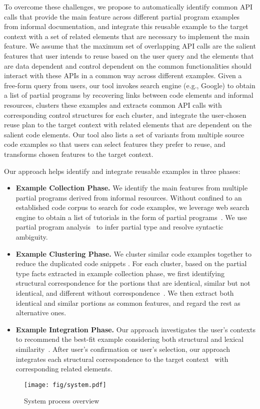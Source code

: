 To overcome these challenges, we propose to automatically identify common API calls that provide the main feature across different partial program examples from informal documentation, and integrate this reusable example to the target context with a set of related elements that are necessary to implement the main feature. We assume that the maximum set of overlapping API calls are the salient features that user intends to reuse based on the user query and the elements that are data dependent and control dependent on the common functionalities should interact with these APIs in a common way across different examples. Given a free-form query from users, our tool invokes search engine (e.g., Google) to obtain a list of partial programs by recovering links between code elements and informal resources, clusters these examples and extracts common API calls with corresponding control structures for each cluster, and integrate the user-chosen reuse plan to the target context with related elements that are dependent on the salient code elements. Our tool also lists a set of variants from multiple source code examples so that users can select features they prefer to reuse, and transforms chosen features to the target context. 

Our approach helps identify and integrate reusable examples in three phases:
\begin{itemize}
\item \textbf{Example Collection Phase.} We identify the main features from multiple partial programs derived from informal resources. Without confined to an established code corpus to search for code examples, we leverage web search engine to obtain a list of tutorials in the form of partial programs~\cite{PeterACE:ICSE13, RecoDoc:ICSE12}. We use partial program analysis~\cite{partialProgram:OOPSLA08} to infer partial type and resolve syntactic ambiguity. 

\item \textbf{Example Clustering Phase.} We cluster similar code examples together to reduce the duplicated code snippets . For each cluster, based on the partial type facts extracted in example collection phase,  we first identifying structural correspondence for the portions that are identical, similar but not identical, and different without correspondence~\cite{Cottrell:generalize07}. We then extract both identical and similar portions as common features, and regard the rest as alternative ones. 

\item \textbf{Example Integration Phase.} Our approach investigates the user's contexts to recommend the best-fit example considering both structural and lexical similarity~\cite{Holmes:reuseStudy09}. After user's confirmation or user's selection, our approach integrates each structural correspondence to the target context~\cite{Cottrell:jigsaw08} with corresponding related elements. 
\end{itemize}

 \begin{figure*}[!htb]
    \centering
\texttt{[image: fig/system.pdf]}
       \caption{System process overview}
        \label{fig:system}
   \end{figure*}


